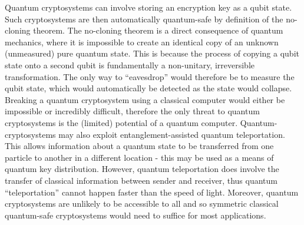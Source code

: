 \documentclass{article}[11pt]
\begin{document}
Quantum cryptosystems can involve storing an encryption key as a qubit state.\cite{quantumcrypt} Such cryptosystems are then automatically quantum-safe by definition of the no-cloning theorem. The no-cloning theorem is a direct consequence of quantum mechanics, where it is impossible to create an identical copy of an unknown (unmeasured) pure quantum state. This is because the process of copying a qubit state onto a second qubit is fundamentally a non-unitary, irreversible transformation.\cite{nielsenChuang} The only way to ``eavesdrop'' would therefore be to measure the qubit state, which would automatically be detected as the state would collapse.\cite{quantumcrypt} Breaking a quantum cryptosystem using a classical computer would either be impossible or incredibly difficult, therefore the only threat to quantum cryptosystems is the (limited) potential of a quantum computer. Quantum-cryptosystems may also exploit entanglement-assisted quantum teleportation.\cite{quantumcrypt} This allows information about a quantum state to be transferred from one particle to another in a different location - this may be used as a means of quantum key distribution. However, quantum teleportation does involve the transfer of classical information between sender and receiver, thus quantum ``teleportation'' cannot happen faster than the speed of light. Moreover, quantum cryptosystems are unlikely to be accessible to all and so symmetric classical quantum-safe cryptosystems would need to suffice for most applications.
\end{document}

